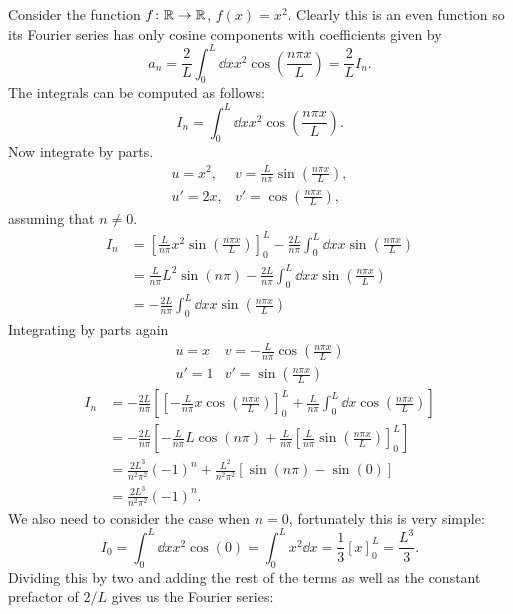 \documentclass[a4paper]{article}
\begin{document}
    Consider the function \(f\colon\mathbb{R}\to\mathbb{R}\), \(f(x) = x^2\).
    Clearly this is an even function so its Fourier series has only cosine components with coefficients given by
    \[a_n = \frac{2}{L} \int_{0}^{L} \dd{x} x^2 \cos\left(\frac{n\pi x}{L}\right) = \frac{2}{L}I_n.\]
    The integrals can be computed as follows:
    \[I_n = \int_0^L \dd{x} x^2 \cos\left(\frac{n\pi x}{L}\right).\]
    Now integrate by parts.
    \[
        \begin{array}{ll}
            u = x^2, & v = \frac{L}{n\pi}\sin\left(\frac{n\pi x}{L}\right),\\[0.5em]
            u' = 2x, & v' = \cos\left(\frac{n\pi x}{L}\right),
        \end{array}
    \]
    assuming that \(n \ne 0\).
    \begin{align*}
        I_n &= \left[\frac{L}{n\pi}x^2\sin\left(\frac{n\pi x}{L}\right)\right]_0^L - \frac{2L}{n\pi}\int_0^L \dd{x} x\sin\left(\frac{n\pi x}{L}\right)\\
        &= \frac{L}{n\pi}L^2\sin(n\pi) - \frac{2L}{n\pi}\int_0^L \dd{x} x\sin\left(\frac{n\pi x}{L}\right)\\
        &= -\frac{2L}{n\pi}\int_0^L \dd{x} x\sin\left(\frac{n\pi x}{L}\right)
    \end{align*}
    Integrating by parts again
    \[
        \begin{array}{ll}
            u = x  & v = -\frac{L}{n\pi}\cos\left(\frac{n\pi x}{L}\right)\\[0.5em]
            u' = 1 & v' = \sin\left(\frac{n\pi x}{L}\right)
        \end{array}
    \]
    \begin{align*}
        I_n &= -\frac{2L}{n\pi}\left[ \left[ -\frac{L}{n\pi} x\cos\left(\frac{n\pi x}{L}\right) \right]_0^L + \frac{L}{n\pi} \int_0^L\dd{x} \cos\left(\frac{n\pi x}{L}\right) \right]\\
        &= -\frac{2L}{n\pi}\left[ -\frac{L}{n\pi}L\cos(n\pi) + \frac{L}{n\pi}\left[ \frac{L}{n\pi}\sin\left(\frac{n\pi x}{L}\right) \right]_0^L \right]\\
        &= \frac{2L^3}{n^2\pi^2}(-1)^n + \frac{L^2}{n^2\pi^2}[\sin(n\pi) - \sin(0)]\\
        &= \frac{2L^3}{n^2\pi^2}(-1)^n.
    \end{align*}
    We also need to consider the case when \(n = 0\), fortunately this is very simple:
    \[I_0 = \int_0^L\dd{x} x^2\cos(0) = \int_0^L x^2 \dd{x} = \frac{1}{3}\left[x\right]_0^L = \frac{L^3}{3}.\]
    Dividing this by two and adding the rest of the terms as well as the constant prefactor of \(2/L\) gives us the Fourier series:
\end{document}
